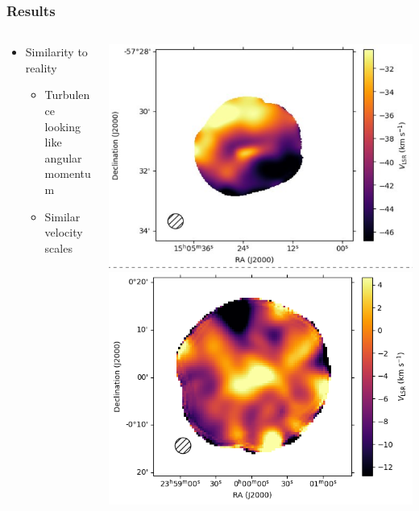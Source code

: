 \documentclass[aspectratio=169,compress]{beamer}
\begin{document}
\begin{frame}
  \frametitle{Results}
  \begin{columns}
    \begin{column}{0.5\linewidth}
      \begin{itemize}
        \item Similarity to reality
          \begin{itemize}
            \item Turbulence looking like angular momentum
            \item Similar velocity scales
          \end{itemize}
      \end{itemize}
    \end{column}
    \begin{column}{0.5\linewidth}
      \includegraphics[width=0.6\linewidth]{figures/smallrealVLSR.png}
      \includegraphics[width=0.6\linewidth]{figures/withdensrrl_200.0_M1.png}
    \end{column}
  \end{columns}
\end{frame}
\end{document}
